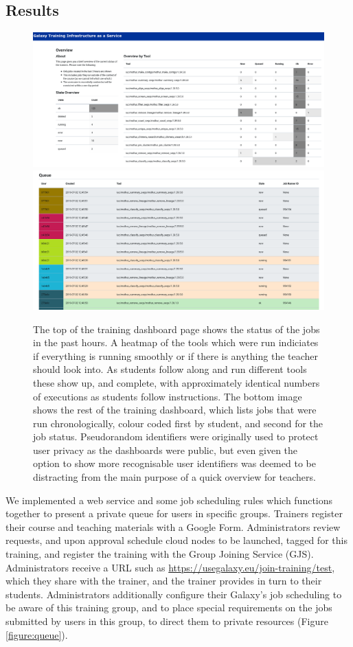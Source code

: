 \documentclass[a4paper,num-refs]{oup-contemporary}
\begin{document}
\subsection{Results}
\begin{figure}[bt!]
\centering
\includegraphics[width=\linewidth]{images/dashboard.png}
\includegraphics[width=\linewidth]{images/queue.png}
	\caption{The top of the training dashboard page shows the status of the jobs in the past hours. A heatmap of the tools which were run indiciates if everything is running smoothly or if there is anything the teacher should look into. As students follow along and run different tools these show up, and complete, with approximately identical numbers of executions as students follow instructions. The bottom image shows the rest of the training dashboard, which lists jobs that were run chronologically, colour coded first by student, and second for the job status. Pseudorandom identifiers were originally used to protect user privacy as the dashboards were public, but even given the option to show more recognisable user identifiers was deemed to be distracting from the main purpose of a quick overview for teachers.}\label{figure:dashboard}
\end{figure}

We implemented a web service and some job scheduling rules which functions together to present a private queue for users in specific groups. Trainers register their course and teaching materials with a Google Form. Administrators review requests, and upon approval schedule cloud nodes to be launched, tagged for this training, and register the training with the Group Joining Service (GJS). Administrators receive a URL such as \url{https://usegalaxy.eu/join-training/test}, which they share with the trainer, and the trainer provides in turn to their students. Administrators additionally configure their Galaxy's job scheduling to be aware of this training group, and to place special requirements on the jobs submitted by users in this group, to direct them to private resources (Figure \ref{figure:queue}).
\end{document}
